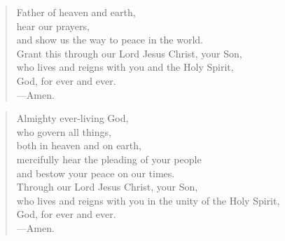 \prayer

\setlength{\leftmargini}{\prayerleftmargini}

\begin{verse}
Father of heaven and earth,\\
hear our prayers,\\
and show us the way to peace in the world.\\
Grant this through our Lord Jesus Christ, your Son,\\
who lives and reigns with you and the Holy Spirit,\\
God, for ever and ever.\\
{\color{red}---\thinspace}Amen.
\end{verse}


\begin{verse}
Almighty ever-living God,\\
who govern all things,\\
both in heaven and on earth,\\
mercifully hear the pleading of your people\\
and bestow your peace on our times.\\
Through our Lord Jesus Christ, your Son,\\
who lives and reigns with you in the unity of the Holy Spirit,\\
God, for ever and ever.\\
{\color{red}---\thinspace}Amen.
\end{verse}

\setlength{\leftmargini}{\defleftmargini}